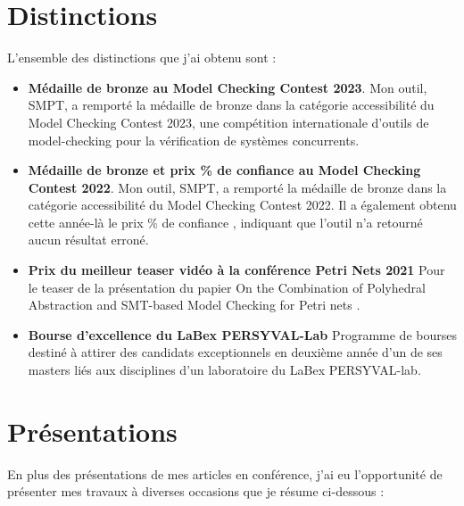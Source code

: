 \label{sec:rayonnement}


\vspace{10pt}
\section{Distinctions}
\vspace{10pt}
L'ensemble des distinctions que j'ai obtenu sont :

\begin{itemize}
  \item \textbf{Médaille de bronze au Model Checking Contest 2023}. \smallbreak
  Mon outil, \textsf{SMPT}, a remporté la médaille de bronze dans la catégorie
  \og accessibilité \fg du Model Checking Contest 2023, une compétition
  internationale d'outils de model-checking pour la vérification de systèmes
  concurrents.\smallbreak

  \item \textbf{Médaille de bronze et prix \% de confiance \fg au Model
  Checking Contest 2022}. \smallbreak 
  Mon outil, \textsf{SMPT}, a remporté la médaille de bronze dans la catégorie
  \og accessibilité \fg du Model Checking Contest 2022. Il a également obtenu cette
  année-là le prix \% de confiance \fg, indiquant que l'outil n'a retourné aucun résultat erroné.
  \smallbreak
  \item \textbf{Prix du meilleur teaser vidéo à la conférence Petri Nets 2021}
  \smallbreak
  Pour le teaser de la présentation du papier \og On the Combination of Polyhedral
  Abstraction and SMT-based Model Checking for Petri nets \fg.\smallbreak
  \item \textbf{Bourse d'excellence du LaBex PERSYVAL-Lab}
  \smallbreak
  Programme de bourses destiné à attirer des candidats exceptionnels en deuxième
  année d'un de ses masters liés aux disciplines d'un laboratoire du LaBex
  PERSYVAL-lab.

\end{itemize}

\vspace{10pt}
\section{Présentations}
\vspace{10pt}

En plus des présentations de mes articles en conférence, j'ai eu l'opportunité de
présenter mes travaux à diverses occasions que je résume ci-dessous :
\vspace{10pt}

